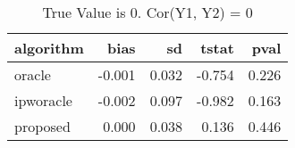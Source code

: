 \begin{table}[h!]
\caption{True Value is 0. Cor(Y1, Y2) = 0}
\centering
\begin{tabular}[t]{lrrrr}
\toprule
algorithm & bias & sd & tstat & pval\\
\midrule
oracle & -0.001 & 0.032 & -0.754 & 0.226\\
ipworacle & -0.002 & 0.097 & -0.982 & 0.163\\
proposed & 0.000 & 0.038 & 0.136 & 0.446\\
\bottomrule
\end{tabular}
\end{table}
